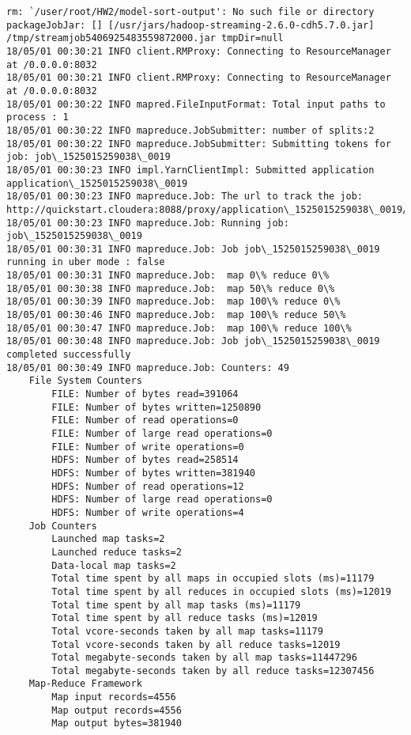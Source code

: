 \documentclass[11pt]{article}
\begin{document}
    \begin{Verbatim}[commandchars=\\\{\}]
rm: `/user/root/HW2/model-sort-output': No such file or directory
packageJobJar: [] [/usr/jars/hadoop-streaming-2.6.0-cdh5.7.0.jar] /tmp/streamjob5406925483559872000.jar tmpDir=null
18/05/01 00:30:21 INFO client.RMProxy: Connecting to ResourceManager at /0.0.0.0:8032
18/05/01 00:30:21 INFO client.RMProxy: Connecting to ResourceManager at /0.0.0.0:8032
18/05/01 00:30:22 INFO mapred.FileInputFormat: Total input paths to process : 1
18/05/01 00:30:22 INFO mapreduce.JobSubmitter: number of splits:2
18/05/01 00:30:22 INFO mapreduce.JobSubmitter: Submitting tokens for job: job\_1525015259038\_0019
18/05/01 00:30:23 INFO impl.YarnClientImpl: Submitted application application\_1525015259038\_0019
18/05/01 00:30:23 INFO mapreduce.Job: The url to track the job: http://quickstart.cloudera:8088/proxy/application\_1525015259038\_0019/
18/05/01 00:30:23 INFO mapreduce.Job: Running job: job\_1525015259038\_0019
18/05/01 00:30:31 INFO mapreduce.Job: Job job\_1525015259038\_0019 running in uber mode : false
18/05/01 00:30:31 INFO mapreduce.Job:  map 0\% reduce 0\%
18/05/01 00:30:38 INFO mapreduce.Job:  map 50\% reduce 0\%
18/05/01 00:30:39 INFO mapreduce.Job:  map 100\% reduce 0\%
18/05/01 00:30:46 INFO mapreduce.Job:  map 100\% reduce 50\%
18/05/01 00:30:47 INFO mapreduce.Job:  map 100\% reduce 100\%
18/05/01 00:30:48 INFO mapreduce.Job: Job job\_1525015259038\_0019 completed successfully
18/05/01 00:30:49 INFO mapreduce.Job: Counters: 49
	File System Counters
		FILE: Number of bytes read=391064
		FILE: Number of bytes written=1250890
		FILE: Number of read operations=0
		FILE: Number of large read operations=0
		FILE: Number of write operations=0
		HDFS: Number of bytes read=258514
		HDFS: Number of bytes written=381940
		HDFS: Number of read operations=12
		HDFS: Number of large read operations=0
		HDFS: Number of write operations=4
	Job Counters 
		Launched map tasks=2
		Launched reduce tasks=2
		Data-local map tasks=2
		Total time spent by all maps in occupied slots (ms)=11179
		Total time spent by all reduces in occupied slots (ms)=12019
		Total time spent by all map tasks (ms)=11179
		Total time spent by all reduce tasks (ms)=12019
		Total vcore-seconds taken by all map tasks=11179
		Total vcore-seconds taken by all reduce tasks=12019
		Total megabyte-seconds taken by all map tasks=11447296
		Total megabyte-seconds taken by all reduce tasks=12307456
	Map-Reduce Framework
		Map input records=4556
		Map output records=4556
		Map output bytes=381940

\end{Verbatim}
\end{document}
